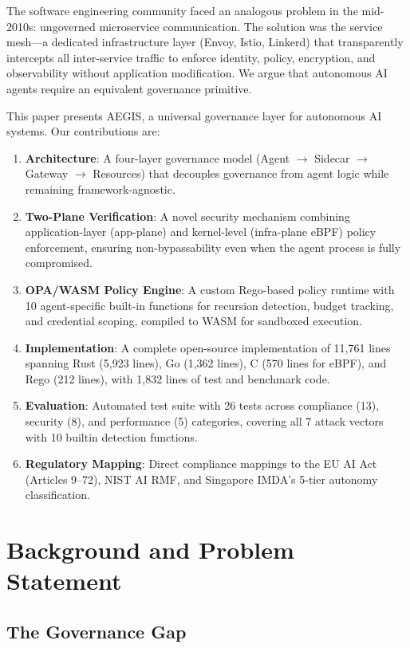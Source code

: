 \documentclass[runningheads]{llncs}
\begin{document}
The software engineering community faced an analogous problem in the mid-2010s: ungoverned microservice communication. The solution was the service mesh---a dedicated infrastructure layer (Envoy, Istio, Linkerd) that transparently intercepts all inter-service traffic to enforce identity, policy, encryption, and observability without application modification. We argue that autonomous AI agents require an equivalent governance primitive.

This paper presents AEGIS, a universal governance layer for autonomous AI systems. Our contributions are:

\begin{enumerate}
\item \textbf{Architecture}: A four-layer governance model (Agent $\to$ Sidecar $\to$ Gateway $\to$ Resources) that decouples governance from agent logic while remaining framework-agnostic.
\item \textbf{Two-Plane Verification}: A novel security mechanism combining application-layer (app-plane) and kernel-level (infra-plane eBPF) policy enforcement, ensuring non-bypassability even when the agent process is fully compromised.
\item \textbf{OPA/WASM Policy Engine}: A custom Rego-based policy runtime with 10 agent-specific built-in functions for recursion detection, budget tracking, and credential scoping, compiled to WASM for sandboxed execution.
\item \textbf{Implementation}: A complete open-source implementation of 11,761 lines spanning Rust (5,923 lines), Go (1,362 lines), C (570 lines for eBPF), and Rego (212 lines), with 1,832 lines of test and benchmark code.
\item \textbf{Evaluation}: Automated test suite with 26 tests across compliance (13), security (8), and performance (5) categories, covering all 7 attack vectors with 10 builtin detection functions.
\item \textbf{Regulatory Mapping}: Direct compliance mappings to the EU AI Act (Articles 9--72), NIST AI RMF, and Singapore IMDA's 5-tier autonomy classification.
\end{enumerate}

\section{Background and Problem Statement}

\subsection{The Governance Gap}
\end{document}
